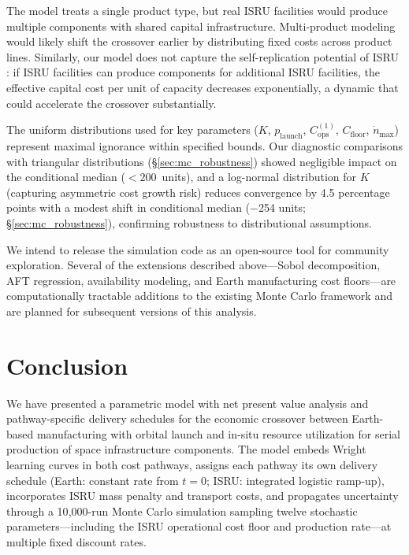 \documentclass[preprint,12pt]{elsarticle}
\begin{document}
The model treats a single product type, but real ISRU facilities would produce multiple components with shared capital infrastructure. Multi-product modeling would likely shift the crossover earlier by distributing fixed costs across product lines. Similarly, our model does not capture the self-replication potential of ISRU \cite{metzger2013}: if ISRU facilities can produce components for additional ISRU facilities, the effective capital cost per unit of capacity decreases exponentially, a dynamic that could accelerate the crossover substantially.

The uniform distributions used for key parameters ($K$, $p_{\mathrm{launch}}$, $C_{\mathrm{ops}}^{(1)}$, $C_{\mathrm{floor}}$, $\dot{n}_{\max}$) represent maximal ignorance within specified bounds. Our diagnostic comparisons with triangular distributions (\S\ref{sec:mc_robustness}) showed negligible impact on the conditional median ($<200$~units), and a log-normal distribution for $K$ (capturing asymmetric cost growth risk) reduces convergence by 4.5 percentage points with a modest shift in conditional median ($-$254 units; \S\ref{sec:mc_robustness}), confirming robustness to distributional assumptions.

We intend to release the simulation code as an open-source tool for community exploration. Several of the extensions described above---Sobol decomposition, AFT regression, availability modeling, and Earth manufacturing cost floors---are computationally tractable additions to the existing Monte Carlo framework and are planned for subsequent versions of this analysis.

\section{Conclusion}
\label{sec:conclusion}

We have presented a parametric model with net present value analysis and pathway-specific delivery schedules for the economic crossover between Earth-based manufacturing with orbital launch and in-situ resource utilization for serial production of space infrastructure components. The model embeds Wright learning curves in both cost pathways, assigns each pathway its own delivery schedule (Earth: constant rate from $t = 0$; ISRU: integrated logistic ramp-up), incorporates ISRU mass penalty and transport costs, and propagates uncertainty through a 10{,}000-run Monte Carlo simulation sampling twelve stochastic parameters---including the ISRU operational cost floor and production rate---at multiple fixed discount rates.
\end{document}

